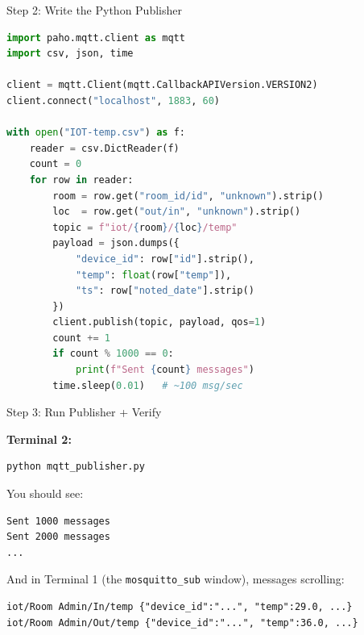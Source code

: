 \documentclass[aspectratio=169,11pt]{beamer}
\begin{document}
\begin{frame}[fragile]{Step 2: Write the Python Publisher}

    \vspace{0.05cm}
\begin{lstlisting}[language=Python]
import paho.mqtt.client as mqtt
import csv, json, time

client = mqtt.Client(mqtt.CallbackAPIVersion.VERSION2)
client.connect("localhost", 1883, 60)

with open("IOT-temp.csv") as f:
    reader = csv.DictReader(f)
    count = 0
    for row in reader:
        room = row.get("room_id/id", "unknown").strip()
        loc  = row.get("out/in", "unknown").strip()
        topic = f"iot/{room}/{loc}/temp"
        payload = json.dumps({
            "device_id": row["id"].strip(),
            "temp": float(row["temp"]),
            "ts": row["noted_date"].strip()
        })
        client.publish(topic, payload, qos=1)
        count += 1
        if count % 1000 == 0:
            print(f"Sent {count} messages")
        time.sleep(0.01)   # ~100 msg/sec
\end{lstlisting}
\end{frame}

\begin{frame}[fragile]{Step 3: Run Publisher + Verify}

    \vspace{0.3cm}
    \textbf{Terminal 2:}
\begin{lstlisting}[language=bash]
python mqtt_publisher.py
\end{lstlisting}

    \vspace{0.2cm}
    You should see:
\begin{lstlisting}
Sent 1000 messages
Sent 2000 messages
...
\end{lstlisting}

    And in Terminal 1 (the \texttt{mosquitto\_sub} window), messages scrolling:
\begin{lstlisting}
iot/Room Admin/In/temp {"device_id":"...", "temp":29.0, ...}
iot/Room Admin/Out/temp {"device_id":"...", "temp":36.0, ...}
\end{lstlisting}

    \vspace{0.2cm}
\end{frame}
\end{document}
